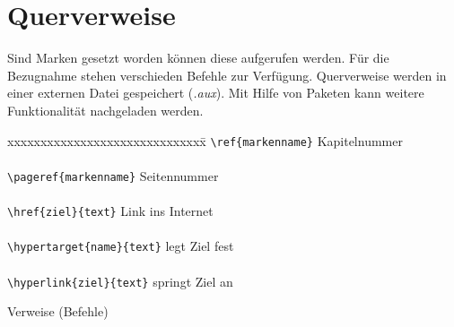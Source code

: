 \section{Querverweise}
Sind Marken gesetzt worden können diese aufgerufen werden. Für die Bezugnahme stehen verschieden Befehle zur Verfügung. Querverweise werden in einer externen Datei gespeichert (\textit{.aux}). Mit Hilfe von Paketen kann weitere Funktionalität nachgeladen werden.
\begin{table}[H]
\begin{tabbing}
xxxxxxxxxxxxxxxxxxxxxxxxxxxxxx\=\kill
\verb=\ref{markenname}=				\>Kapitelnummer\\
\\
\verb=\pageref{markenname}=			\>Seitennummer\\
\\
\verb=\href{ziel}{text}=				\>Link ins Internet\\
\\
\verb=\hypertarget{name}{text}=			\>legt Ziel fest\\
\\
\verb=\hyperlink{ziel}{text}=				\>springt Ziel an\\
\end{tabbing}
\caption{Verweise (Befehle)}
\end{table}